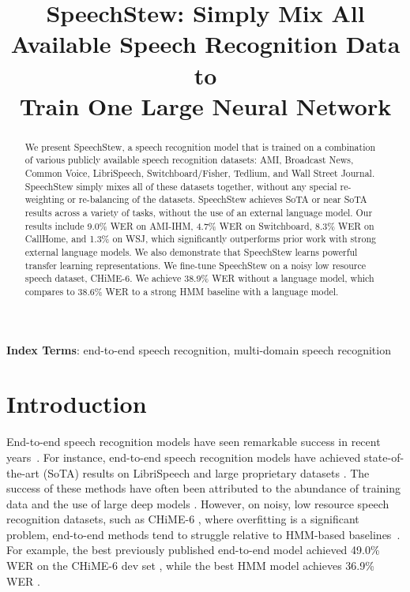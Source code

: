 \documentclass[a4paper]{article}
\title{SpeechStew: Simply Mix All Available Speech Recognition Data to \\ Train One Large Neural Network}
\begin{document}
\maketitle
\begin{abstract}
We present SpeechStew, a speech recognition model that is trained on a combination of various publicly available speech recognition datasets: AMI, Broadcast News, Common Voice, LibriSpeech, Switchboard/Fisher, Tedlium, and Wall Street Journal. SpeechStew simply mixes all of these datasets together, without any special re-weighting or re-balancing of the datasets. SpeechStew achieves SoTA or near SoTA results across a variety of tasks, without the use of an external language model. Our results include 9.0\% WER on AMI-IHM, 4.7\% WER on Switchboard, 8.3\% WER on CallHome, and 1.3\% on WSJ, which significantly outperforms prior work with strong external language models. We also demonstrate that SpeechStew learns powerful transfer learning representations. We fine-tune SpeechStew on a noisy low resource speech dataset, CHiME-6. We achieve 38.9\% WER without a language model, which compares to 38.6\% WER to a strong HMM baseline with a language model.
\end{abstract}

\noindent\textbf{Index Terms}: end-to-end speech recognition, multi-domain speech recognition

\section{Introduction}
End-to-end speech recognition models \cite{graves-icml-2014,chan-icassp-2016,chan-icml-2020} have seen remarkable success in recent years~\cite{park-interspeech-2019}. For instance, end-to-end speech recognition models have achieved state-of-the-art (SoTA) results on LibriSpeech \cite{zhang-arxiv-2020} and large proprietary datasets \cite{chiu-icassp-2018}. The success of these methods have  often been attributed to the abundance of training data \cite{chiu-icassp-2018} and the use of large deep models \cite{zhang-arxiv-2020}. However, on noisy, low resource speech recognition datasets, such as CHiME-6 \cite{watanabe-arxiv-2020}, where overfitting is a significant problem, end-to-end methods tend to struggle relative to HMM-based baselines~\cite{andrusenko-arxiv-2020}. For example, the best previously published end-to-end model achieved 49.0\% WER on the CHiME-6 dev set \cite{andrusenko-arxiv-2020}, while the best HMM model achieves 36.9\% WER \cite{medennikov-chime-2020}.
\end{document}
